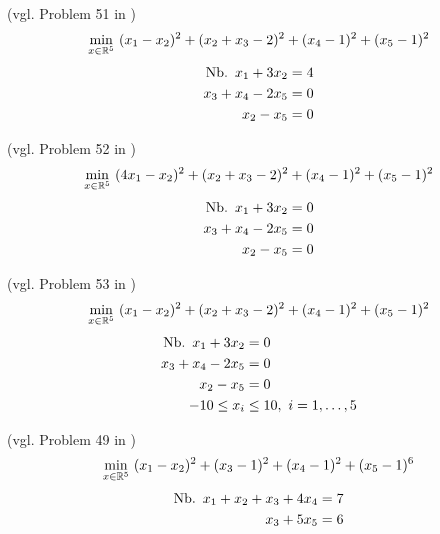 \begin{testproblem}
(vgl. Problem 51 in \cite[S.~74]{hock})
\begin{equation}
\min_{x\in\mathbb{R}^5}\ (x_1 - x_2)^2 + (x_2 + x_3 - 2)^2 + (x_4 - 1)^2 + (x_5 - 1)^2
\end{equation}
\begin{equation*}
\begin{split}
\nb x_1 + 3 x_2 & = 4 \\
x_3 + x_4 - 2 x_5 & = 0 \\
x_2 - x_5 & = 0 \\
\end{split}
\end{equation*}
\end{testproblem}

\begin{testproblem}
(vgl. Problem 52 in \cite[S.~75]{hock})
\begin{equation}
\min_{x\in\mathbb{R}^5}\ (4 x_1 - x_2)^2 + (x_2 + x_3 - 2)^2 + (x_4 - 1)^2 + (x_5 - 1)^2
\end{equation}
\begin{equation*}
\begin{split}
\nb x_1 + 3 x_2 & = 0 \\
x_3 + x_4 - 2 x_5 & = 0 \\
x_2 - x_5 & = 0 \\
\end{split}
\end{equation*}
\end{testproblem}

\begin{testproblem}
(vgl. Problem 53 in \cite[S.~76]{hock})
\begin{equation}
\min_{x\in\mathbb{R}^5}\ (x_1 - x_2)^2 + (x_2 + x_3 - 2)^2 + (x_4 - 1)^2 + (x_5 - 1)^2
\end{equation}
\begin{equation*}
\begin{split}
\nb x_1 + 3 x_2 & = 0 \\
x_3 + x_4 - 2 x_5 & = 0 \\
x_2 - x_5 & = 0 \\
-10 \leq x_i & \leq 10,\ i = 1,\ldots,5 \\
\end{split}
\end{equation*}
\end{testproblem}

\begin{testproblem}
(vgl. Problem 49 in \cite[S.~72]{hock})
\begin{equation}
\min_{x\in\mathbb{R}^5}\ (x_1-x_2)^2 + (x_3-1)^2 + (x_4-1)^2 + (x_5-1)^6 
\end{equation}
\begin{equation*}
\begin{split}
\nb x_1 + x_2 + x_3 + 4 x_4 & = 7 \\
x_3 + 5 x_5 & = 6 \\
\end{split}
\end{equation*}
\end{testproblem}

